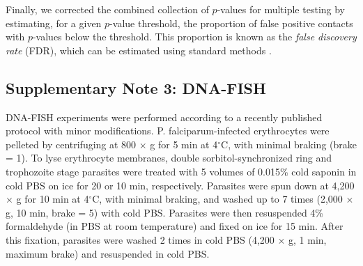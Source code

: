 Finally, we corrected the combined collection of $p$-values for multiple
testing by estimating, for a given $p$-value threshold, the proportion of
false positive contacts with $p$-values below the threshold. This proportion is known as the {\em false discovery rate} (FDR), which can be estimated using standard methods \cite{benjamini:controlling}.

\subsection*{Supplementary Note 3: DNA-FISH}
\label{supp:ourFISH}
DNA-FISH experiments were performed according to a recently published protocol \cite{contreras:modified} with minor modifications.
P. falciparum-infected erythrocytes were pelleted by centrifuging at 800 $\times$ g for 5 min at 4$^\circ$C, with minimal braking (brake = 1). To lyse erythrocyte membranes, double sorbitol-synchronized ring and trophozoite stage parasites were treated with 5 volumes of 0.015\% cold saponin in cold PBS on ice for 20 or 10 min, respectively. Parasites were spun down at 4,200 $\times$ g for 10 min at 4$^\circ$C, with minimal braking, and washed up to 7 times (2,000 $\times$ g, 10 min, brake = 5) with cold PBS. Parasites were then resuspended 4\% formaldehyde (in PBS at room temperature) and fixed on ice for 15 min. After this fixation, parasites were washed 2 times in cold PBS (4,200 $\times$ g, 1 min, maximum brake) and resuspended in cold PBS.

